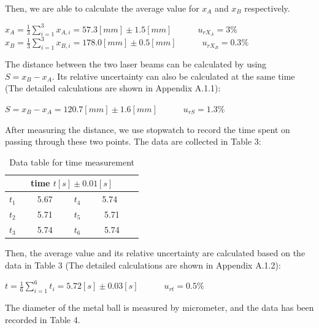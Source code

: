 \documentclass[a4paper,12pt]{article}
\begin{document}
Then, we are able to calculate the average value for $x_A$ and $x_B$ respectively.
\begin{center}
$\displaystyle x_A = \frac{1}{3}\sum_{i=1}^3x_{A,i} = 57.3 [mm] \pm  1.5[mm] $~~~~~~$\displaystyle u_{rX_A} = 3\%$
\\
$\displaystyle x_B = \frac{1}{3}\sum_{i=1}^3x_{B,i} = 178.0 [mm] \pm  0.5[mm] $~~~~~~$\displaystyle u_{rX_B} = 0.3\%$
\end{center}

The distance between the two laser beams can be calculated by using $S = x_B - x_A$. Its relative uncertainty can also be calculated at the same time (The detailed calculations are shown in Appendix A.1.1):
\begin{center}
$\displaystyle S = x_B - x_A = 120.7 [mm] \pm 1.6 [mm] $~~~~~~$\displaystyle u_{rS} = 1.3 \%$
\end{center}

\par After measuring the distance, we use stopwatch to record the time spent on passing through these two points. The data are collected in Table 3:

\begin{table}[h]
\begin{center}
\begin{tabular}{|c|c|c|c|}
\hline
\multicolumn{4}{|c|}{time $t [s] \pm 0.01 [s]$} \\
\hline
$t_1$ & ~~~5.67~~~ & $t_4$ & ~~~5.74~~~~\\
$t_2$ & 5.71 & $t_5$ & 5.71 \\
$t_3$ & 5.74 & $t_6$ & 5.74 \\
\hline
\end{tabular}
\caption{Data table for time measurement}
\end{center}
\end{table}

Then, the average value and its relative uncertainty are calculated based on the data in Table 3 (The detailed calculations are shown in Appendix A.1.2):
\begin{center}
$\displaystyle t = \frac{1}{6}\sum_{i=1}^6t_i = 5.72 [s] \pm 0.03 [s]$~~~~~~$\displaystyle u_{rt} = 0.5 \%$
\end{center}

\par The diameter of the metal ball is measured by micrometer, and the data has been recorded in Table 4.
\end{document}
